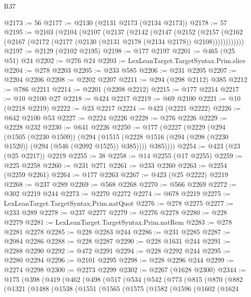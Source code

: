 \begin{lexlean}{R37}
\begin{coremodule}
@2173 := 56
@2177 := @2130 (@2131 @2173 (@2134 @2173))
@2178 := 57
@2195 := @2103
    (@2104
      (@2107
        (@2137
          (@2142
            (@2147
              (@2152
                (@2157
                  (@2162 (@2167 (@2172 (@2177 (@2130 (@2131 @2178 (@2134 @2178)) @2108))))))))))))
@2197 := @2129 (@2102 @2195)
@2198 := @177 @2197
@2201 := @465 (@25 @51) @24
@2202 := @276 @24
@2203 := LexLeanTarget.TargetSyntax.Prim.slice
@2204 := @278 @2203
@2205 := @233 @585
@2206 := @231 @2205
@2207 := @2204 @2206
@2208 := @2202 @2207
@2211 := @294 (@298 @2112) @385
@2212 := @786 @2211
@2214 := @2201 (@2208 @2212)
@2215 := @177 @2214
@2217 := @10 @2100 @27
@2218 := @424 @2217
@2219 := @69 @2100
@2221 := @10 (@2218 @2219)
@2222 := @23 @2217
@2224 := @423 (@2221 @2222)
@2226 := @642 @2100 @53
@2227 := @2224 @2226
@2228 := @276 @2226
@2229 := @2228 @232
@2230 := @641 @2226
@2250 := @177
    (@2227
      (@2229
        (@294
          (@1505 (@2230 @1509))
          (@294
            (@1515 (@2228 @1516 (@294 (@298 (@2230 @1520)) (@294 (@546 (@2092 @1525)) @385))))
            @385))))
@2254 := @423 (@23 (@25 @2217)) @2219
@2255 := 38
@2258 := @14 @2255 (@17 @2255)
@2259 := @225 @2258
@2260 := @231 @271
@2261 := @233 @2260
@2263 := @2254 (@2259 @2261)
@2264 := @177 @2263
@2267 := @423 (@25 @2222) @2219
@2268 := @237 @289
@2269 := @568 @2268
@2270 := @566 @2269
@2272 := @302 @2219 @244
@2273 := @2270 @2272
@2274 := @678 @2219
@2275 := LexLeanTarget.TargetSyntax.Prim.natQuot
@2276 := @278 @2275
@2277 := @233 @289
@2278 := @237 @2277
@2279 := @2276 @2278
@2280 := @228 @2279
@2281 := LexLeanTarget.TargetSyntax.Prim.natRem
@2283 := @278 @2281 @2278
@2285 := @228 @2283 @244
@2286 := @231 @2285
@2287 := @2084 @2286
@2288 := @228 @2287
@2290 := @228 @1631 @244
@2291 := @2288 @2290
@2292 := @472 @2291
@2294 := @228 @2292 @244
@2295 := @2280 @2294
@2296 := @2101 @2295
@2298 := @228 @2296 @244
@2299 := @2274 @2298
@2300 := @2273 @2299
@2302 := @2267 (@1628 @2300)
@2344 := @175
    (@398
      (@419
        (@462
          (@498
            (@517
              (@534
                (@542
                  (@773
                    (@815
                      (@870
                        (@882
                          (@1321
                            (@1488
                              (@1538
                                (@1551
                                  (@1565
                                    (@1575
                                      (@1582
                                        (@1596
                                          (@1602
                                            (@1624

\end{coremodule}
\end{lexlean}
